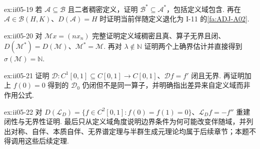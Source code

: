 \begin{FAExercise}[伴随反转包含与有界兼容性]{ex:ii05-19}
若 \(\displaystyle\mathcal A\subseteq\mathcal B\) 且二者稠密定义，证明 \(\displaystyle\mathcal B^*\subseteq\mathcal A^*\)，包括定义域包含. 再在 \(\displaystyle\mathcal A\in\mathcal B(H,K)\)、\(\displaystyle D(\mathcal A)=H\) 时证明当前伴随定义退化为 I-11 的\autoref{fa:ADJ-A02}.
\end{FAExercise}

\begin{FAExercise}[无界乘法算子模型与无界谱]{ex:ii05-20}
对 \(\displaystyle\mathcal Mx=(nx_n)\) 完整证明定义域稠密且真、算子无界且闭、\(\displaystyle D(\mathcal M^*)=D(\mathcal M)\)、\(\displaystyle\mathcal M^*=\mathcal M\). 再对 \(\displaystyle\lambda\notin\mathbb N\) 证明两个上确界估计并直接得到 \(\displaystyle\sigma(\mathcal M)=\mathbb N\).
\end{FAExercise}

\begin{FAExercise}[一阶微分算子模型与同公式不同域]{ex:ii05-21}
证明 \(\displaystyle\mathcal D:C^1[0,1]\subseteq C[0,1]\to C[0,1]\)、\(\displaystyle\mathcal Df=f'\) 闭且无界. 再证明加上 \(\displaystyle f(0)=0\) 得到的 \(\displaystyle\mathcal D_0\) 仍闭但不是同一算子，并明确指出差异来自定义域而非作用公式.
\end{FAExercise}

\begin{FAExercise}{ex:ii05-22}
对 \(\displaystyle D(\mathcal L_D)=\{f\in C^2[0,1]:f(0)=f(1)=0\}\)、\(\displaystyle\mathcal L_Df=-f''\) 重建闭性与无界性证明. 最后只从定义域角度说明边界条件为何可能改变伴随域，并列出对称、自伴、本质自伴、无界谱定理与半群生成元理论均属于后续章节；本题不得调用这些后续定理.
\end{FAExercise}
